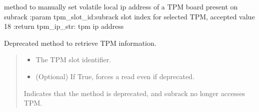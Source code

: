 \documentclass[letterpaper,10pt,english]{sphinxmanual}
\begin{document}
\begin{fulllineitems}
\begin{fulllineitems}
\begin{quote}
\begin{description}
\end{description}\end{quote}

\end{fulllineitems}


\begin{fulllineitems}
\label{\detokenize{apidocs:subrack_management_board.SubrackMngBoard.GetTPMIP}}
\pysigstartsignatures
{}
\pysigstopsignatures
\sphinxAtStartPar
method to manually set volatile local ip address of a TPM board present on subrack
:param tpm\_slot\_id:subrack slot index for selected TPM, accepted value 1\sphinxhyphen{}8
:return tpm\_ip\_str: tpm ip address

\end{fulllineitems}


\begin{fulllineitems}
\label{\detokenize{apidocs:subrack_management_board.SubrackMngBoard.GetTPMInfo}}
\pysigstartsignatures
{}
\pysigstopsignatures
\sphinxAtStartPar
Deprecated method to retrieve TPM information.
\begin{quote}\begin{description}
\begin{itemize}
\item {} 
\sphinxAtStartPar
{} \textendash{} The TPM slot identifier.

\item {} 
\sphinxAtStartPar
{} \textendash{} (Optional) If True, forces a read even if deprecated.

\end{itemize}

\sphinxAtStartPar
{\hyperref[\detokenize{apidocs:subrack_management_board.SubrackExecFault}]{}} \textendash{} Indicates that the method is deprecated, and
subrack no longer accesses TPM.


\end{description}
\end{quote}
\end{fulllineitems}
\end{fulllineitems}
\end{document}
